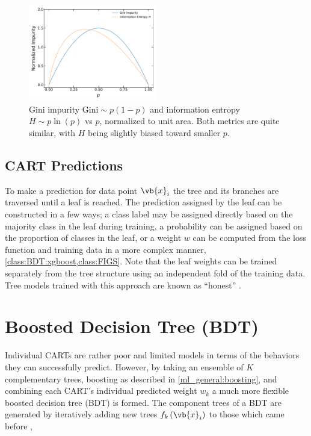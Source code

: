 \begin{figure}[H]
\centering
\includegraphics[width=0.5\textwidth]{figures/ml/gini_vs_info_entropy}
\caption{
Gini impurity $\text{Gini} \sim p\left(1-p\right)$ and
information entropy $H \sim p \ln\left(p\right)$
vs $p$, normalized to unit area.
Both metrics are quite similar,
with $H$ being slightly biased toward smaller $p$.
}
\label{fig:gini_vs_info_entropy}
\end{figure}

\subsection{CART Predictions}
\label{class:CART:pred}

To make a prediction for data point $\vb{x}_{i}$
the tree and its branches are traversed until a leaf is reached.
The prediction assigned by the leaf can be constructed in a few ways;
a class label may be assigned directly based on the majority class in the leaf during training,
a probability can be assigned based on the proportion of classes in the leaf,
or a weight $w$ can be computed from the loss function and training data in a more complex manner,
\eg \cref{class:BDT:xgboost,class:FIGS}.
Note that the leaf weights can be trained separately from the tree structure
using an independent fold of the training data.
Tree models trained with this approach are known as ``honest'' \cite{JMLR:v13:biau12a,pmlr-v32-denil14}.

\section{Boosted Decision Tree (BDT)}
\label{class:BDT}

Individual CARTs are rather poor and limited models
in terms of the behaviors they can successfully predict.
However, by taking an ensemble of $K$ complementary trees,
\ie boosting \cite{10.5555/3091696.3091715,FREUND1997119,Breiman1996BiasV,friedman2000} as described in \cref{ml_general:boosting},
and combining each CART's individual predicted weight $w_{k}$
a much more flexible boosted decision tree (BDT) is formed.
The component trees of a BDT are generated by iteratively adding new trees $f_{k}\left(\vb{x}_{i}\right)$ to those which came before \cite{XGBoost},

